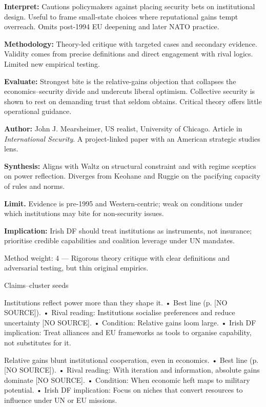 	\textbf{Interpret:} Cautions policymakers against placing security bets on institutional design. Useful to frame small-state choices where reputational gains tempt overreach. Omits post-1994 EU deepening and later NATO practice.
	
	\textbf{Methodology:} Theory-led critique with targeted cases and secondary evidence. Validity comes from precise definitions and direct engagement with rival logics. Limited new empirical testing.
	
	\textbf{Evaluate:} Strongest bite is the relative-gains objection that collapses the economics–security divide and undercuts liberal optimism. Collective security is shown to rest on demanding trust that seldom obtains. Critical theory offers little operational guidance.
	
	\textbf{Author:} John J. Mearsheimer, US realist, University of Chicago. Article in \textit{International Security}. A project-linked paper with an American strategic studies lens.
	
	\textbf{Synthesis:} Aligns with Waltz on structural constraint and with regime sceptics on power reflection. Diverges from Keohane and Ruggie on the pacifying capacity of rules and norms.
	
	\textbf{Limit.} Evidence is pre-1995 and Western-centric; weak on conditions under which institutions may bite for non-security issues.
	
	\textbf{Implication:} Irish DF should treat institutions as instruments, not insurance; prioritise credible capabilities and coalition leverage under UN mandates.


Method weight: 4 — Rigorous theory critique with clear definitions and adversarial testing, but thin original empirics.

Claims–cluster seeds

Institutions reflect power more than they shape it.
• Best line (p. [NO SOURCE]).
• Rival reading: Institutions socialise preferences and reduce uncertainty [NO SOURCE].
• Condition: Relative gains loom large.
• Irish DF implication: Treat alliances and EU frameworks as tools to organise capability, not substitutes for it.

Relative gains blunt institutional cooperation, even in economics.
• Best line (p. [NO SOURCE]).
• Rival reading: With iteration and information, absolute gains dominate [NO SOURCE].
• Condition: When economic heft maps to military potential.
• Irish DF implication: Focus on niches that convert resources to influence under UN or EU missions.


